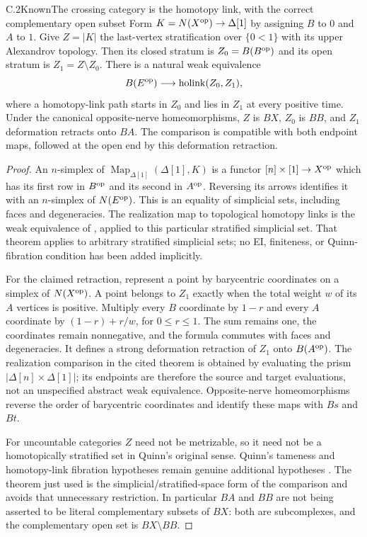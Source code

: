 \begin{statement}{C.2}{Known}{The crossing category is the homotopy link, with the correct complementary open subset}
Form $K=N(X^{\mathrm{op}})\to\Delta[1]$ by assigning $B$ to $0$ and $A$ to $1$. Give $Z=|K|$ the last-vertex stratification over $\{0<1\}$ with its upper Alexandrov topology. Then its closed stratum is $Z_0=B(B^{\mathrm{op}})$ and its open stratum is $Z_1=Z\setminus Z_0$. There is a natural weak equivalence
\[
 B(E^{\mathrm{op}})\longrightarrow
 \operatorname{holink}(Z_0,Z_1),
\]
where a homotopy-link path starts in $Z_0$ and lies in $Z_1$ at every positive time. Under the canonical opposite-nerve homeomorphisms, $Z$ is $BX$, $Z_0$ is $BB$, and $Z_1$ deformation retracts onto $BA$. The comparison is compatible with both endpoint maps, followed at the open end by this deformation retraction.
\end{statement}
\begin{proof}
An $n$-simplex of $\operatorname{Map}_{\Delta[1]}(\Delta[1],K)$ is a functor $[n]\times[1]\to X^{\mathrm{op}}$ which has its first row in $B^{\mathrm{op}}$ and its second in $A^{\mathrm{op}}$. Reversing its arrows identifies it with an $n$-simplex of $N(E^{\mathrm{op}})$. This is an equality of simplicial sets, including faces and degeneracies. The realization map to topological homotopy links is the weak equivalence of \citet[Theorem~6.1]{CDDouteauWaas2022}, applied to this particular stratified simplicial set. That theorem applies to arbitrary stratified simplicial sets; no EI, finiteness, or Quinn-fibration condition has been added implicitly.

For the claimed retraction, represent a point by barycentric coordinates on a simplex of $N(X^{\mathrm{op}})$. A point belongs to $Z_1$ exactly when the total weight $w$ of its $A$ vertices is positive. Multiply every $B$ coordinate by $1-r$ and every $A$ coordinate by $(1-r)+r/w$, for $0\leq r\leq1$. The sum remains one, the coordinates remain nonnegative, and the formula commutes with faces and degeneracies. It defines a strong deformation retraction of $Z_1$ onto $B(A^{\mathrm{op}})$. The realization comparison in the cited theorem is obtained by evaluating the prism $|\Delta[n]\times\Delta[1]|$; its endpoints are therefore the source and target evaluations, not an unspecified abstract weak equivalence. Opposite-nerve homeomorphisms reverse the order of barycentric coordinates and identify these maps with $Bs$ and $Bt$.

For uncountable categories $Z$ need not be metrizable, so it need not be a homotopically stratified set in Quinn's original sense. Quinn's tameness and homotopy-link fibration hypotheses remain genuine additional hypotheses \citep[\S\S2.1,3.1]{CDQuinn1988}. The theorem just used is the simplicial/stratified-space form of the comparison and avoids that unnecessary restriction. In particular $BA$ and $BB$ are not being asserted to be literal complementary subsets of $BX$: both are subcomplexes, and the complementary open set is $BX\setminus BB$.
\end{proof}

